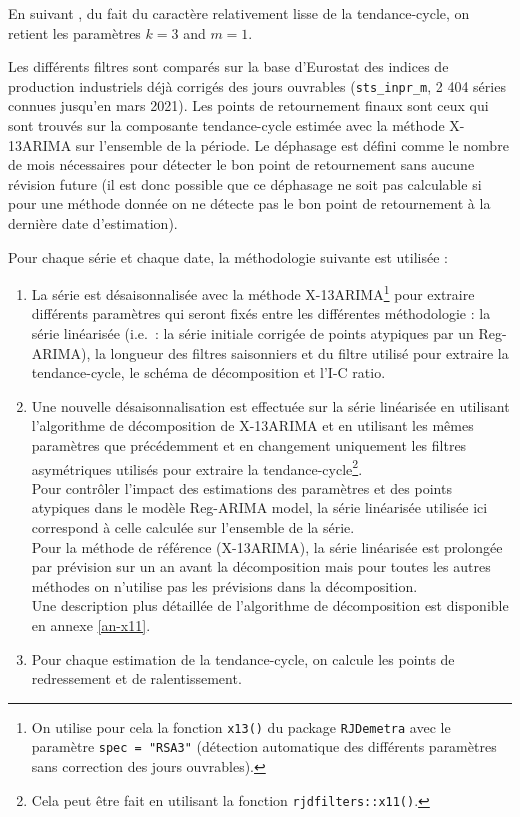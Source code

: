 \documentclass[
  11pt,
  french,
  a4paper]{article}
\newcommand\1{\mathds{1}}
\begin{document}
En suivant \textcite{Zellner1991}, du fait du caractère relativement lisse de la tendance-cycle, on retient les paramètres \(k=3\) and \(m=1\).

Les différents filtres sont comparés sur la base d'Eurostat des indices de production industriels déjà corrigés des jours ouvrables (\texttt{sts\_inpr\_m}, 2 404 séries connues jusqu'en mars 2021).
Les points de retournement finaux sont ceux qui sont trouvés sur la composante tendance-cycle estimée avec la méthode X-13ARIMA sur l'ensemble de la période.
Le déphasage est défini comme le nombre de mois nécessaires pour détecter le bon point de retournement sans aucune révision future (il est donc possible que ce déphasage ne soit pas calculable si pour une méthode donnée on ne détecte pas le bon point de retournement à la dernière date d'estimation).

Pour chaque série et chaque date, la méthodologie suivante est utilisée :

\begin{enumerate}
\def\labelenumi{\arabic{enumi}.}
\item
  La série est désaisonnalisée avec la méthode X-13ARIMA\footnote{
    On utilise pour cela la fonction \texttt{x13()} du package \texttt{RJDemetra} avec le paramètre \texttt{spec\ =\ "RSA3"} (détection automatique des différents paramètres sans correction des jours ouvrables).} pour extraire différents paramètres qui seront fixés entre les différentes méthodologie : la série linéarisée (i.e.~: la série initiale corrigée de points atypiques par un Reg-ARIMA), la longueur des filtres saisonniers et du filtre utilisé pour extraire la tendance-cycle, le schéma de décomposition et l'I-C ratio.
\item
  Une nouvelle désaisonnalisation est effectuée sur la série linéarisée en utilisant l'algorithme de décomposition de X-13ARIMA et en utilisant les mêmes paramètres que précédemment et en changement uniquement les filtres asymétriques utilisés pour extraire la tendance-cycle\footnote{
    Cela peut être fait en utilisant la fonction \texttt{rjdfilters::x11()}.}.\\
  Pour contrôler l'impact des estimations des paramètres et des points atypiques dans le modèle Reg-ARIMA model, la série linéarisée utilisée ici correspond à celle calculée sur l'ensemble de la série.\\
  Pour la méthode de référence (X-13ARIMA), la série linéarisée est prolongée par prévision sur un an avant la décomposition mais pour toutes les autres méthodes on n'utilise pas les prévisions dans la décomposition.\\
  Une description plus détaillée de l'algorithme de décomposition est disponible en annexe \ref{an-x11}.
\item
  Pour chaque estimation de la tendance-cycle, on calcule les points de redressement et de ralentissement.
\end{enumerate}
\end{document}
